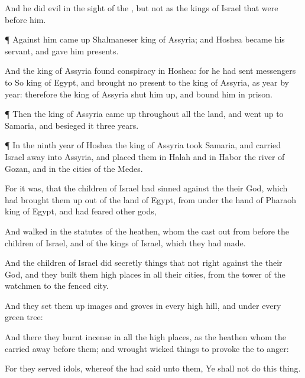 {And he
did
{}
evil in the
sight of the
{}, but not as the
kings of
Israel that were
before him.


\par }{\PP {}¶ Against him came
up
Shalmaneser
king of
Assyria; and
Hoshea became his
servant, and
gave him
presents.

And the
king of
Assyria
found
conspiracy in
Hoshea: for he had
sent
messengers to
So
king of
Egypt, and
brought no
present to the
king of
Assyria, as
{}
year by
year: therefore the
king of
Assyria shut him
up, and
bound him in
prison.


\par }{\PP {}¶ Then the
king of
Assyria came
up throughout all the
land, and went
up to
Samaria, and
besieged it
three
years.


\par }{\PP {}¶ In the
ninth
year of
Hoshea the
king of
Assyria
took
Samaria, and
carried
Israel
away into
Assyria, and
placed them in
Halah and in
Habor
{} the
river of
Gozan, and in the
cities of the
Medes.


\par }{\PP {}For
{} it was, that the
children of
Israel had
sinned against the
{} their
God, which had brought them
up out of the
land of
Egypt, from under the
hand of
Pharaoh
king of
Egypt, and had
feared
other
gods,

And
walked in the
statutes of the
heathen, whom the
{} cast
out from
before the
children of
Israel, and of the
kings of
Israel, which they had
made.

And the
children of
Israel did
secretly
{}
things that
{} not right against the
{} their
God, and they
built them high
places in all their
cities, from the
tower of the
watchmen to the
fenced
city.

And they set them
up
images and
groves in every
high
hill, and under every
green
tree:

And there they burnt
incense in all the high
places, as
{} the
heathen whom the
{} carried
away
before them; and
wrought
wicked
things to provoke the
{} to
anger:

For they
served
idols, whereof the
{} had
said unto them, Ye shall not
do this
thing.

}
